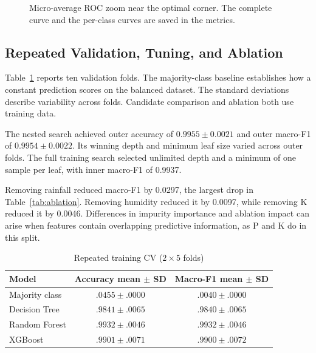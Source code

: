 \documentclass[conference]{IEEEtran}
\begin{document}
\begin{figure}[t]
\centering
{}
\caption{Micro-average ROC zoom near the optimal corner. The complete curve and the per-class curves are saved in the metrics.}
\label{fig:roc}
\end{figure}

\subsection{Repeated Validation, Tuning, and Ablation}
Table~\ref{tab:repeated} reports ten validation folds. The majority-class baseline establishes how a constant prediction scores on the balanced dataset. The standard deviations describe variability across folds. Candidate comparison and ablation both use training data.

The nested search achieved outer accuracy of $0.9955\pm0.0021$ and outer macro-F1 of $0.9954\pm0.0022$. Its winning depth and minimum leaf size varied across outer folds. The full training search selected unlimited depth and a minimum of one sample per leaf, with inner macro-F1 of 0.9937.

Removing rainfall reduced macro-F1 by 0.0297, the largest drop in Table~\ref{tab:ablation}. Removing humidity reduced it by 0.0097, while removing K reduced it by 0.0046. Differences in impurity importance and ablation impact can arise when features contain overlapping predictive information, as P and K do in this split.

\begin{table}[t]
\caption{Repeated training CV ($2\times5$ folds)}
\label{tab:repeated}
\centering\footnotesize
\begin{tabular}{@{}lcc@{}}
\toprule
Model & Accuracy mean $\pm$ SD & Macro-F1 mean $\pm$ SD \\
\midrule
Majority class & $.0455\pm.0000$ & $.0040\pm.0000$ \\
Decision Tree & $.9841\pm.0065$ & $.9840\pm.0065$ \\
Random Forest & $.9932\pm.0046$ & $.9932\pm.0046$ \\
XGBoost & $.9901\pm.0071$ & $.9900\pm.0072$ \\
\bottomrule
\end{tabular}
\end{table}
\end{document}
